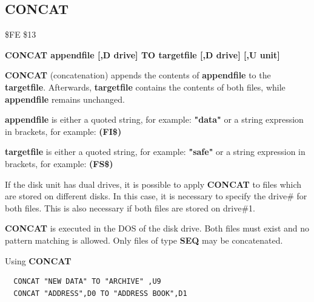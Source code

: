 \subsection{CONCAT}
\begin{description}[leftmargin=2cm,style=nextline]
\item [Token:] \$FE \$13
\item [Format:] {\bf CONCAT appendfile [,D drive] TO
                targetfile [,D drive] [,U unit] }
\item [Usage:]
   {\bf CONCAT} (concatenation) appends the contents of
   {\bf appendfile} to the {\bf targetfile}. Afterwards, {\bf targetfile}
   contains the contents of both files, while {\bf appendfile}
   remains unchanged.

   {\bf appendfile} is either a quoted string, for example: {\bf "data"} or
   a string expression in brackets, for example: {\bf (FI\$)}

   {\bf targetfile} is either a quoted string, for example: {\bf "safe"} or
   a string expression in brackets, for example: {\bf (FS\$)}

   If the disk unit has dual drives, it is possible to apply
   {\bf CONCAT} to files which are stored on different
   disks. In this case, it is necessary to specify the drive\#
   for both files. This is also necessary if both
   files are stored on drive\#1.

   \drivedefinition

   \unitdefinition

\item [Remarks:]
   {\bf CONCAT} is executed in the DOS of the disk drive.
   Both files must exist and no pattern matching is allowed.
   Only files of type {\bf SEQ} may be concatenated.

\item [Examples:] Using {\bf CONCAT}
\begin{tcolorbox}[colback=black,coltext=white]
\verbatimfont{\codefont}
\begin{verbatim}
  CONCAT "NEW DATA" TO "ARCHIVE" ,U9
  CONCAT "ADDRESS",D0 TO "ADDRESS BOOK",D1
\end{verbatim}
\end{tcolorbox}
\end{description}


\newpage
